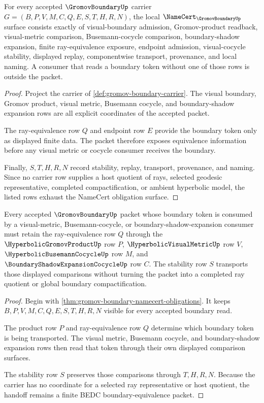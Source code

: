 \begin{theorem}\label{thm:gromov-boundary-namecert-obligations}
For every accepted $\GromovBoundaryUp$ carrier $G=(B,P,V,M,C,Q,E,S,T,H,R,N)$, the local $\NameCert_{\GromovBoundaryUp}$ surface consists exactly of visual-boundary admission, Gromov-product readback, visual-metric comparison, Busemann-cocycle comparison, boundary-shadow expansion, finite ray-equivalence exposure, endpoint admission, visual-cocycle stability, displayed replay, componentwise transport, provenance, and local naming. A consumer that reads a boundary token without one of those rows is outside the packet.
\end{theorem}
\begin{proof}
Project the carrier of \autoref{def:gromov-boundary-carrier}. The visual boundary, Gromov product, visual metric, Busemann cocycle, and boundary-shadow expansion rows are all explicit coordinates of the accepted packet.

The ray-equivalence row $Q$ and endpoint row $E$ provide the boundary token only as displayed finite data. The packet therefore exposes equivalence information before any visual metric or cocycle consumer receives the boundary.

Finally, $S,T,H,R,N$ record stability, replay, transport, provenance, and naming. Since no carrier row supplies a host quotient of rays, selected geodesic representative, completed compactification, or ambient hyperbolic model, the listed rows exhaust the NameCert obligation surface.
\end{proof}

\begin{theorem}\label{thm:gromov-boundary-visual-cocycle-stability}
Every accepted $\GromovBoundaryUp$ packet whose boundary token is consumed by a visual-metric, Busemann-cocycle, or boundary-shadow-expansion consumer must retain the ray-equivalence row $Q$ through the $\HyperbolicGromovProductUp$ row $P$, $\HyperbolicVisualMetricUp$ row $V$, $\HyperbolicBusemannCocycleUp$ row $M$, and $\BoundaryShadowExpansionCocycleUp$ row $C$. The stability row $S$ transports those displayed comparisons without turning the packet into a completed ray quotient or global boundary compactification.
\end{theorem}
\begin{proof}
Begin with \autoref{thm:gromov-boundary-namecert-obligations}. It keeps $B,P,V,M,C,Q,E,S,T,H,R,N$ visible for every accepted boundary read.

The product row $P$ and ray-equivalence row $Q$ determine which boundary token is being transported. The visual metric, Busemann cocycle, and boundary-shadow expansion rows then read that token through their own displayed comparison surfaces.

The stability row $S$ preserves those comparisons through $T,H,R,N$. Because the carrier has no coordinate for a selected ray representative or host quotient, the handoff remains a finite BEDC boundary-equivalence packet.
\end{proof}

